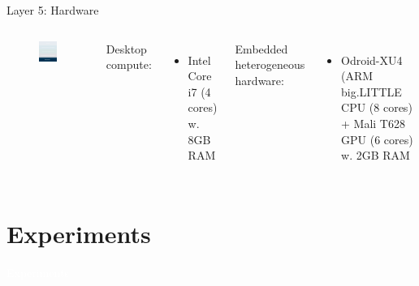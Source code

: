 \documentclass[xcolor=dvipsnames]{beamer}
\begin{document}
\begin{frame}{Layer 5: Hardware}

\begin{columns}


\begin{figure}
    \centering
    \includegraphics[width=3.5cm]{images/hardwares.pdf}
\end{figure}


Desktop compute:
\begin{itemize}
    \item Intel Core i7 (4 cores) w. 8GB RAM
\end{itemize}

\vspace{0.5cm}
Embedded heterogeneous hardware:
\begin{itemize}
    \item Odroid-XU4 (ARM big.LITTLE CPU (8 cores) + Mali T628 GPU (6 cores) w. 2GB RAM
\end{itemize}
\end{columns}


\end{frame}




\section{Experiments}

{
\begin{frame}
    \centering
    \textcolor{white}{\LARGE Experiments}
\end{frame}
}
\end{document}
